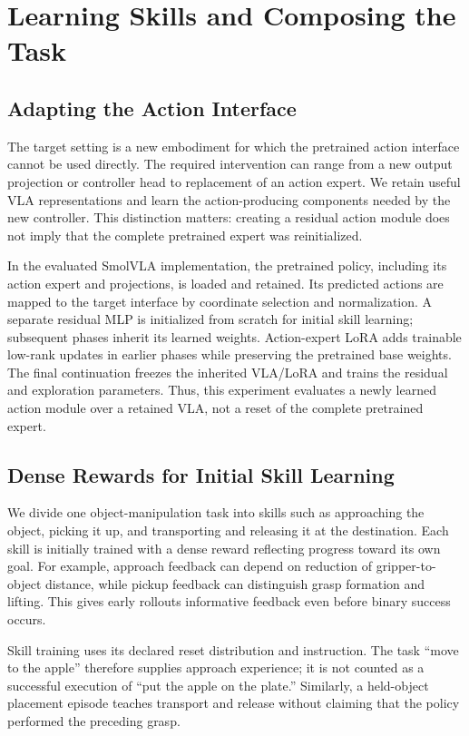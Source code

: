 \section{Learning Skills and Composing the Task}\label{sec:method}
\subsection{Adapting the Action Interface}
The target setting is a new embodiment for which the pretrained action interface cannot be used directly. The required intervention can range from a new output projection or controller head to replacement of an action expert. We retain useful VLA representations and learn the action-producing components needed by the new controller. This distinction matters: creating a residual action module does not imply that the complete pretrained expert was reinitialized.

In the evaluated SmolVLA implementation, the pretrained policy, including its action expert and projections, is loaded and retained. Its predicted actions are mapped to the target interface by coordinate selection and normalization. A separate residual MLP is initialized from scratch for initial skill learning; subsequent phases inherit its learned weights. Action-expert LoRA adds trainable low-rank updates in earlier phases while preserving the pretrained base weights. The final continuation freezes the inherited VLA/LoRA and trains the residual and exploration parameters. Thus, this experiment evaluates a newly learned action module over a retained VLA, not a reset of the complete pretrained expert.

\subsection{Dense Rewards for Initial Skill Learning}
We divide one object-manipulation task into skills such as approaching the object, picking it up, and transporting and releasing it at the destination. Each skill is initially trained with a dense reward reflecting progress toward its own goal. For example, approach feedback can depend on reduction of gripper-to-object distance, while pickup feedback can distinguish grasp formation and lifting. This gives early rollouts informative feedback even before binary success occurs.

Skill training uses its declared reset distribution and instruction. The task ``move to the apple'' therefore supplies approach experience; it is not counted as a successful execution of ``put the apple on the plate.'' Similarly, a held-object placement episode teaches transport and release without claiming that the policy performed the preceding grasp. 


